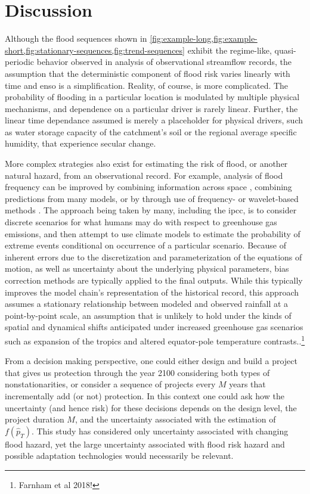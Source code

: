 \documentclass[12pt]{article}
\begin{document}
\section{Discussion}

Although the flood sequences shown in \cref{fig:example-long,fig:example-short,fig:stationary-sequences,fig:trend-sequences} exhibit the regime-like, quasi-periodic behavior observed in analysis of observational streamflow records, the assumption that the deterministic component of flood risk varies linearly with time and \gls{enso} is a simplification.
Reality, of course, is more complicated.
The probability of flooding in a particular location is modulated by multiple physical mechanisms, and dependence on a particular driver is rarely linear.
Further, the linear time dependance assumed is merely a placeholder for physical drivers, such as water storage capacity of the catchment's soil or the regional average specific humidity, that experience secular change.

More complex strategies also exist for estimating the risk of flood, or another natural hazard, from an observational record.
For example, analysis of flood frequency can be improved by combining information across space \citep{Merz2008a,Lima2016}, combining predictions from many models, or by through use of frequency- or wavelet-based methods \citep{Kwon2007}.
The approach being taken by many, including the \gls{ipcc}, is to consider discrete scenarios for what humans may do with respect to greenhouse gas emissions, and then attempt to use climate models to estimate the probability of extreme events conditional on occurrence of a particular scenario.
Because of inherent errors due to the discretization and parameterization of the equations of motion, as well as uncertainty about the underlying physical parameters, bias correction methods \citep[\eg quantile-quantile mapping;][]{Rajczak2016} are typically applied to the final outputs.
While this typically improves the model chain's representation of the historical record, this approach assumes a stationary relationship between modeled and observed rainfall at a point-by-point scale, an assumption that is unlikely to hold under the kinds of spatial and dynamical shifts anticipated under increased greenhouse gas scenarios such as expansion of the tropics and altered equator-pole temperature contrasts.\citep{Dankers2009,Ott2013,Merz2014,Dittes2017}.\footnote{Farnham et al 2018!}

From a decision making perspective, one could either design and build a project that gives us protection through the year 2100 considering both types of nonstationarities, or consider a sequence of projects every $M$ years that incrementally add (or not) protection.
In this context one could ask how the uncertainty (and hence risk) for these decisions depends on the design level, the project duration $M$, and the uncertainty associated with the estimation of $f(\hat{p}_T)$.
This study has considered only uncertainty associated with changing flood hazard, yet the large uncertainty associated with flood risk hazard and possible adaptation technologies would necessarily be relevant.
\end{document}
